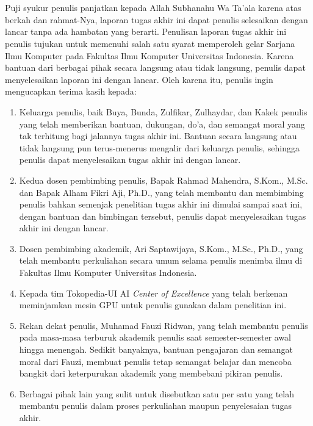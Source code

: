 \chapter*{\kataPengantar}
\pagestyle{first-pages}

Puji syukur penulis panjatkan kepada Allah Subhanahu Wa Ta'ala karena atas berkah dan rahmat-Nya, laporan tugas akhir ini dapat penulis selesaikan dengan lancar tanpa ada hambatan yang berarti. Penulisan laporan tugas akhir ini penulis tujukan untuk memenuhi salah satu syarat memperoleh gelar Sarjana Ilmu Komputer pada Fakultas Ilmu Komputer Universitas Indonesia. Karena bantuan dari berbagai pihak secara langsung atau tidak langsung, penulis dapat menyelesaikan laporan ini dengan lancar. Oleh karena itu, penulis ingin mengucapkan terima kasih kepada:

\begin{enumerate}[topsep=0pt,itemsep=-1ex,partopsep=1ex,parsep=1ex]

\item Keluarga penulis, baik Buya, Bunda, Zulfikar, Zulhaydar, dan Kakek penulis yang telah memberikan bantuan, dukungan, do'a, dan semangat moral yang tak terhitung bagi jalannya tugas akhir ini. Bantuan secara langsung atau tidak langsung pun terus-menerus mengalir dari keluarga penulis, sehingga penulis dapat menyelesaikan tugas akhir ini dengan lancar.

\item Kedua dosen pembimbing penulis, Bapak Rahmad Mahendra, S.Kom., M.Sc. dan Bapak Alham Fikri Aji, Ph.D., yang telah membantu dan membimbing penulis bahkan semenjak penelitian tugas akhir ini dimulai sampai saat ini, dengan bantuan dan bimbingan tersebut, penulis dapat menyelesaikan tugas akhir ini dengan lancar.

\item Dosen pembimbing akademik, Ari Saptawijaya, S.Kom., M.Sc., Ph.D., yang telah membantu perkuliahan secara umum selama penulis menimba ilmu di Fakultas Ilmu Komputer Universitas Indonesia.

\item Kepada tim Tokopedia-UI AI \emph{Center of Excellence} yang telah berkenan meminjamkan mesin GPU untuk penulis gunakan dalam penelitian ini.

\item Rekan dekat penulis, Muhamad Fauzi Ridwan, yang telah membantu penulis pada masa-masa terburuk akademik penulis saat semester-semester awal hingga menengah. Sedikit banyaknya, bantuan pengajaran dan semangat moral dari Fauzi, membuat penulis tetap semangat belajar dan mencoba bangkit dari keterpurukan akademik yang membebani pikiran penulis.

\item Berbagai pihak lain yang sulit untuk disebutkan satu per satu yang telah membantu penulis dalam proses perkuliahan maupun penyelesaian tugas akhir.

\end{enumerate}

